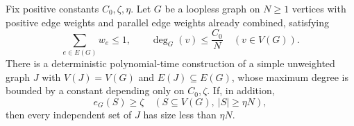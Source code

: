 \begin{lemma}\label{lem:deterministic-density-sparsification}
Fix positive constants $C_0,\zeta,\eta$. Let $G$ be a loopless
graph on $N\ge1$ vertices with positive edge weights
and parallel edge weights already combined, satisfying
\begin{equation}\label{eq:aks-sparsification-input}
 \sum_{e\in E(G)}w_e\le1,\qquad
 \deg_G(v)\le\frac{C_0}N\quad(v\in V(G)).
\end{equation}
There is a deterministic polynomial-time
construction of a simple unweighted graph $J$ with
$V(J)=V(G)$ and $E(J)\subseteq E(G)$, whose
maximum degree is bounded by a constant depending only on
$C_0,\zeta$. If, in addition,
\begin{equation}\label{eq:aks-sparsification-density-input}
 e_G(S)\ge\zeta\quad(S\subseteq V(G),\ |S|\ge\eta N),
\end{equation}
then every independent set of $J$ has size less than $\eta N$.
\end{lemma}

